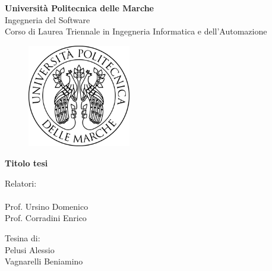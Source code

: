 \documentclass[12pt, oneside]{report}
\begin{document}
\begin{titlepage}
\begin{center}
    {\LARGE\bf{Università Politecnica delle Marche\\}}
    \vspace{0.5cm}
    {\LARGE{Ingegneria del Software}}\\
    {\LARGE{Corso di Laurea Triennale in Ingegneria Informatica e dell'Automazione}}
\end{center}
    
\begin{figure}[H]
    \centering
    \includegraphics[width=0.4\textwidth]{logo.png}
\end{figure}

\begin{center}
    {\LARGE{\bf Titolo tesi}}
\end{center}

\vspace{2cm}

\begin{minipage}[t]{0.49\textwidth}
    {\Large{ Relatori:\\\\ Prof. Ursino Domenico}}
    {\Large{ \\ Prof. Corradini Enrico}}
\end{minipage}\hfill\begin{minipage}[t]{0.49\textwidth}\raggedleft
    {\Large{ Tesina di:\\ Pelusi Alessio }}
    {\Large{ \\ Vagnarelli Beniamino }}
\end{minipage}

\vspace{25mm}

\end{titlepage}


%


\tableofcontents


\thispagestyle{empty}
\clearpage
\setcounter{page}{1}








\end{document}
